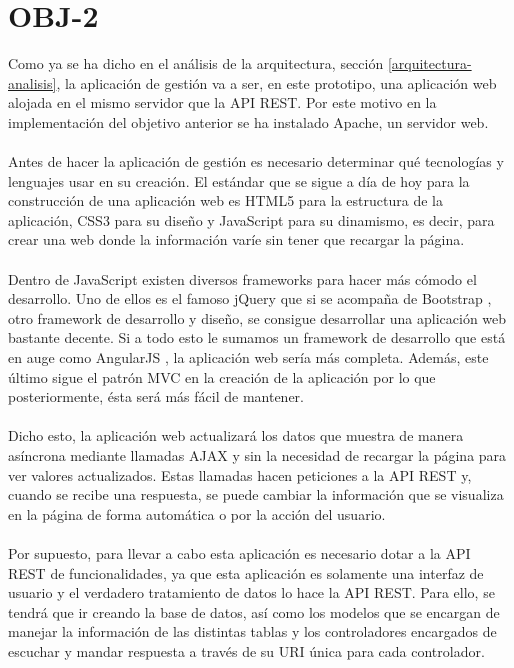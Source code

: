 \section{OBJ-2}
Como ya se ha dicho en el análisis de la arquitectura, sección \ref{arquitectura-analisis}, la aplicación de gestión va a ser, en este prototipo, una aplicación web alojada en el mismo servidor que la API REST. Por este motivo en la implementación del objetivo anterior se ha instalado Apache, un servidor web.
\\\\
Antes de hacer la aplicación de gestión es necesario determinar qué tecnologías y lenguajes usar en su creación. El estándar que se sigue a día de hoy para la construcción de una aplicación web es HTML5 para la estructura de la aplicación, CSS3 para su diseño y JavaScript para su dinamismo, es decir, para crear una web donde la información varíe sin tener que recargar la página. 
\\\\
Dentro de JavaScript existen diversos frameworks para hacer más cómodo el desarrollo. Uno de ellos es el famoso jQuery \cite{jquery} que si se acompaña de Bootstrap \cite{bootstrap}, otro framework de desarrollo y diseño, se consigue desarrollar una aplicación web bastante decente. Si a todo esto le sumamos un framework de desarrollo que está en auge como AngularJS \cite{angularjs}, la aplicación web sería más completa. Además, este último sigue el patrón MVC en la creación de la aplicación por lo que posteriormente, ésta será más fácil de mantener.
\\\\
Dicho esto, la aplicación web actualizará los datos que muestra de manera asíncrona mediante llamadas AJAX y sin la necesidad de recargar la página para ver valores actualizados. Estas llamadas hacen peticiones a la API REST y, cuando se recibe una respuesta, se puede cambiar la información que se visualiza en la página de forma automática o por la acción del usuario.
\\\\
Por supuesto, para llevar a cabo esta aplicación es necesario dotar a la API REST de funcionalidades, ya que esta aplicación es solamente una interfaz de usuario y el verdadero tratamiento de datos lo hace la API REST. Para ello, se tendrá que ir creando la base de datos, así como los modelos que se encargan de manejar la información de las distintas tablas y los controladores encargados de escuchar y mandar respuesta a través de su URI única para cada controlador.

